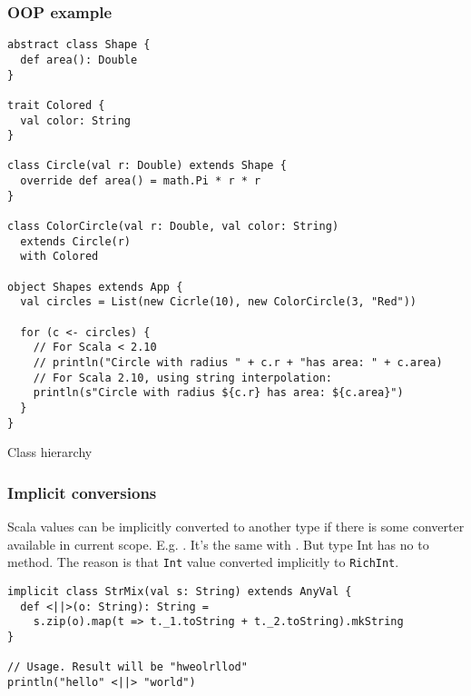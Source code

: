 \begin{frame}[fragile]
\frametitle{OOP example}

\begin{lstlisting}
abstract class Shape {
  def area(): Double
}

trait Colored {
  val color: String
}

class Circle(val r: Double) extends Shape {
  override def area() = math.Pi * r * r
}

class ColorCircle(val r: Double, val color: String) 
  extends Circle(r) 
  with Colored

object Shapes extends App {
  val circles = List(new Cicrle(10), new ColorCircle(3, "Red"))

  for (c <- circles) {
    // For Scala < 2.10
    // println("Circle with radius " + c.r + "has area: " + c.area)
    // For Scala 2.10, using string interpolation:
    println(s"Circle with radius ${c.r} has area: ${c.area}")
  }
}

\end{lstlisting}
\end{frame}

\begin{frame}{Class hierarchy}


\end{frame}


\begin{frame}[fragile]
\frametitle{Implicit conversions}

Scala values can be implicitly converted to another type if there is some converter available in current scope. E.g.
. It's the same with . But type Int has no to method.
The reason is that \texttt{Int} value converted implicitly to \texttt{RichInt}.

\begin{example}
\begin{lstlisting}
implicit class StrMix(val s: String) extends AnyVal {
  def <||>(o: String): String =
    s.zip(o).map(t => t._1.toString + t._2.toString).mkString
}

// Usage. Result will be "hweolrllod"
println("hello" <||> "world")
\end{lstlisting}
\end{example}

\end{frame}

